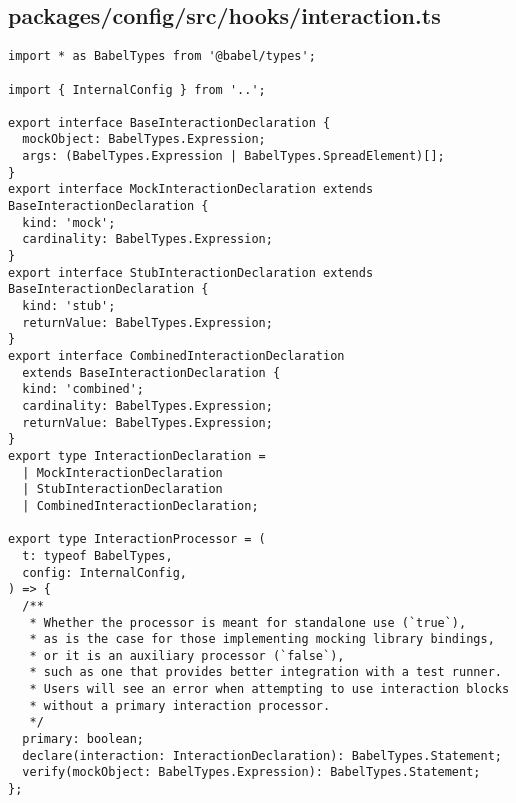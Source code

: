 \subsection*{packages/config/src/hooks/interaction.ts}
\begin{verbatim}
import * as BabelTypes from '@babel/types';

import { InternalConfig } from '..';

export interface BaseInteractionDeclaration {
  mockObject: BabelTypes.Expression;
  args: (BabelTypes.Expression | BabelTypes.SpreadElement)[];
}
export interface MockInteractionDeclaration extends BaseInteractionDeclaration {
  kind: 'mock';
  cardinality: BabelTypes.Expression;
}
export interface StubInteractionDeclaration extends BaseInteractionDeclaration {
  kind: 'stub';
  returnValue: BabelTypes.Expression;
}
export interface CombinedInteractionDeclaration
  extends BaseInteractionDeclaration {
  kind: 'combined';
  cardinality: BabelTypes.Expression;
  returnValue: BabelTypes.Expression;
}
export type InteractionDeclaration =
  | MockInteractionDeclaration
  | StubInteractionDeclaration
  | CombinedInteractionDeclaration;

export type InteractionProcessor = (
  t: typeof BabelTypes,
  config: InternalConfig,
) => {
  /**
   * Whether the processor is meant for standalone use (`true`),
   * as is the case for those implementing mocking library bindings,
   * or it is an auxiliary processor (`false`),
   * such as one that provides better integration with a test runner.
   * Users will see an error when attempting to use interaction blocks
   * without a primary interaction processor.
   */
  primary: boolean;
  declare(interaction: InteractionDeclaration): BabelTypes.Statement;
  verify(mockObject: BabelTypes.Expression): BabelTypes.Statement;
};
\end{verbatim}

